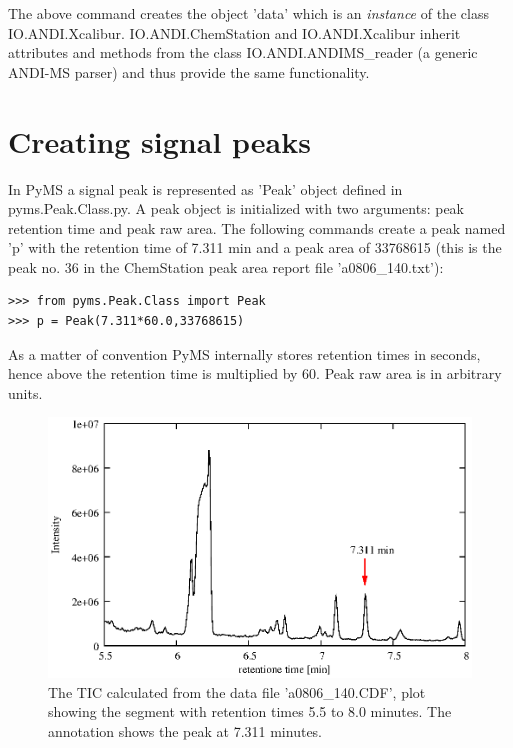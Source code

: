 \noindent
The above command creates the object 'data' which is an {\em instance}
of the class IO.ANDI.Xcalibur. IO.ANDI.ChemStation and IO.ANDI.Xcalibur 
inherit attributes and methods from the class IO.ANDI.ANDIMS\_reader
(a generic ANDI-MS parser) and thus provide the same functionality.

\section{Creating signal peaks}


In PyMS a signal peak is represented as 'Peak' object defined in
pyms.Peak.Class.py. A peak object is initialized with two arguments:
peak retention time and peak raw area. The following commands create
a peak named 'p' with the retention time of 7.311 min and a peak area
of 33768615 (this is the peak no. 36 in the ChemStation peak area report
file 'a0806\_140.txt'):

\begin{verbatim}
>>> from pyms.Peak.Class import Peak
>>> p = Peak(7.311*60.0,33768615)
\end{verbatim}

\noindent
As a matter of convention PyMS internally stores retention times in seconds,
hence above the retention time is multiplied by 60. Peak raw area is in
arbitrary units.

\begin{figure}[htp]
\begin{center}
\includegraphics{graphics/tic_with_peak/tic_with_peak.eps}
\caption{The TIC calculated from the data file 'a0806\_140.CDF', plot showing the
segment with retention times 5.5 to 8.0 minutes. The annotation shows the peak at
7.311 minutes.}
\label{fig:mass-spectrum}
\end{center}
\end{figure}

